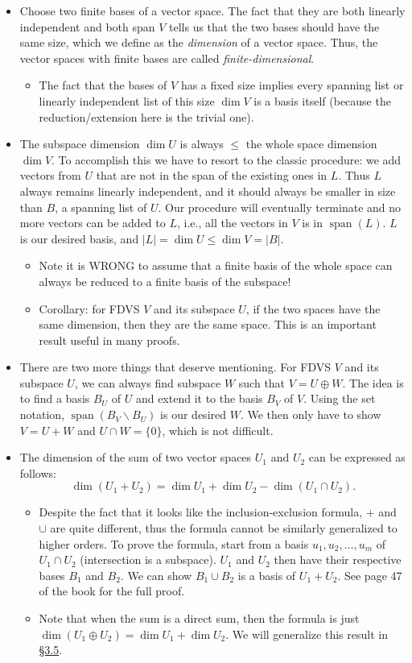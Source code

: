 \documentclass[11pt]{article}
\newcommand{\lk}[2]{\hyperlink{subsection.#1.#2}{\S#1.#2}}
\newcommand{\df}[1]{\textit{\textsf{#1}}}
\newcommand{\s}{\operatorname{span}}
\renewcommand{\d}{\dim}
\newcommand{\abs}[1]{\lvert #1 \rvert}
\begin{document}
\begin{itemize}
    \item Choose two finite bases of a vector space. The fact that they are both linearly independent and both span $V$ tells us that the two bases should have the same size, which we define as the \df{dimension} of a vector space. Thus, the vector spaces with finite bases are called \df{finite-dimensional}.
    \begin{itemize}
        \item The fact that the bases of $V$ has a fixed size implies every spanning list or linearly independent list of this size $\d V$ is a basis itself (because the reduction/extension here is the trivial one).
    \end{itemize}
    \item The subspace dimension $\d U$ is always $\leq$ the whole space dimension $\d V$. To accomplish this we have to resort to the classic procedure: we add vectors from $U$ that are not in the span of the existing ones in $L$. Thus $L$ always remains linearly independent, and it should always be smaller in size than $B$, a spanning list of $U$. Our procedure will eventually terminate and no more vectors can be added to $L$, i.e., all the vectors in $V$ is in $\s(L)$. $L$ is our desired basis, and $\abs{L} = \d U \leq \d V = \abs{B}$.
    \begin{itemize}
        \item Note it is WRONG to assume that a finite basis of the whole space can always be reduced to a finite basis of the subspace!
        \item Corollary: for FDVS $V$ and its subspace $U$, if the two spaces have the same dimension, then they are the same space. This is an important result useful in many proofs.
    \end{itemize}
    \item There are two more things that deserve mentioning. For FDVS $V$ and its subspace $U$, we can always find subspace $W$ such that $V = U \oplus W$. The idea is to find a basis $B_U$ of $U$ and extend it to the basis $B_V$ of $V$. Using the set notation, $\s(B_V \backslash B_U)$ is our desired $W$. We then only have to show $V = U+W$ and $U \cap W = \{0\}$, which is not difficult.
    \item The dimension of the sum of two vector spaces $U_1$ and $U_2$ can be expressed as follows: $$\d (U_1 + U_2) = \d U_1 + \d U_2 - \d (U_1 \cap U_2).$$
    \begin{itemize}
        \item Despite the fact that it looks like the inclusion-exclusion formula, $+$ and $\cup$ are quite different, thus the formula cannot be similarly generalized to higher orders. To prove the formula, start from a basis $u_1,u_2,\dots,u_m$ of $U_1 \cap U_2$ (intersection is a subspace). $U_1$ and $U_2$ then have their respective bases $B_1$ and $B_2$. We can show $B_1 \cup B_2$ is a basis of $U_1 + U_2$. See page 47 of the book for the full proof.
        \item Note that when the sum is a direct sum, then the formula is just $\d(U_1 \oplus U_2) = \d U_1 + \d U_2$. We will generalize this result in \lk{3}{5}.
    \end{itemize}
\end{itemize}
\end{document}
